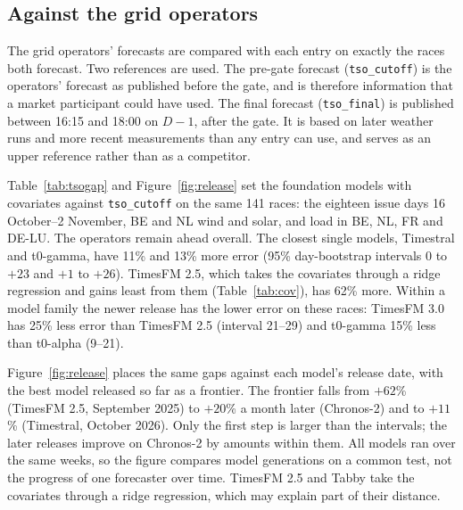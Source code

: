 \documentclass[11pt,a4paper]{article}
\newcommand{\m}[1]{\texttt{#1}}
\begin{document}
\subsection{Against the grid operators}
\label{sec:tso}

The grid operators' forecasts are compared with each entry on exactly the races both forecast. Two references are
used. The pre-gate forecast (\m{tso\_cutoff}) is the operators' forecast as published before the gate, and is therefore
information that a market participant could have used. The final forecast (\m{tso\_final}) is published between 16:15
and 18:00 on $D-1$, after the gate. It is based on later weather runs and more recent measurements than any entry can
use, and serves as an upper reference rather than as a competitor.

Table~\ref{tab:tsogap} and Figure~\ref{fig:release} set the foundation models with covariates against \m{tso\_cutoff} on the same 141 races: the
eighteen issue days 16 October--2 November, BE and NL wind and solar, and load in BE, NL, FR and DE-LU. The operators remain
ahead overall. The closest single models, Timestral and t0-gamma, have 11\% and 13\% more error (95\% day-bootstrap
intervals $0$ to $+23$ and $+1$ to $+26$). TimesFM 2.5, which takes the covariates through a ridge regression and gains
least from them (Table~\ref{tab:cov}), has 62\% more. Within a model family the newer release has the lower error on
these races: TimesFM 3.0 has 25\% less error than TimesFM 2.5 (interval 21--29) and t0-gamma 15\% less than t0-alpha
(9--21).

Figure~\ref{fig:release} places the same gaps against each model's release date, with the best model released so far
as a frontier. The frontier falls from $+62$\% (TimesFM 2.5, September 2025) to $+20$\% a month later (Chronos-2) and
to $+11$\% (Timestral, October 2026). Only the first step is larger than the intervals; the later releases improve on
Chronos-2 by amounts within them. All models ran over the same weeks, so the figure compares model generations on a
common test, not the progress of one forecaster over time. TimesFM 2.5 and Tabby take the covariates through a ridge
regression, which may explain part of their distance.
\end{document}
